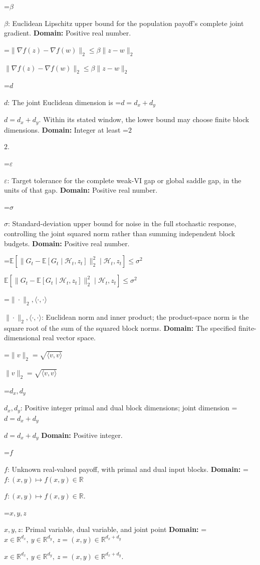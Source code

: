 \documentclass[10pt,a4paper]{article}
\newcommand{\AtlasMath}[1]{\par\begingroup\centering\setbox0=\hbox{$\displaystyle #1$}\ifdim\wd0>1.4\linewidth\typeout{ATLAS WIDE FORMULA: \the\wd0}\fi\ifdim\wd0>\linewidth\resizebox{\linewidth}{!}{\box0}\else\box0\fi\par\endgroup}
\newcommand{\AtlasInlineMath}[1]{\begingroup\setbox0=\hbox{$#1$}\ifdim\wd0>.4\linewidth\endgroup\AtlasMath{#1}\else\endgroup$#1$\fi}
\begin{document}
\AtlasInlineMath{\beta}: Euclidean Lipschitz upper bound for the population payoff's complete joint gradient. \textbf{Domain:} Positive real number.



\AtlasInlineMath{\|\nabla f(z)-\nabla f(w)\|_2\le\beta\|z-w\|_2}



\AtlasInlineMath{d}: The joint Euclidean dimension is \AtlasInlineMath{d=d_x+d_y}. Within its stated window, the lower bound may choose finite block dimensions. \textbf{Domain:} Integer at least \AtlasInlineMath{2}.



\AtlasInlineMath{\varepsilon}: Target tolerance for the complete weak-VI gap or global saddle gap, in the units of that gap. \textbf{Domain:} Positive real number.



\AtlasInlineMath{\sigma}: Standard-deviation upper bound for noise in the full stochastic response, controlling the joint squared norm rather than summing independent block budgets. \textbf{Domain:} Positive real number.



\AtlasInlineMath{\mathbb E[\|G_t-\mathbb E[G_t\mid\mathcal H_t,z_t]\|_2^2\mid\mathcal H_t,z_t]\le\sigma^2}



\AtlasInlineMath{\|\cdot\|_2,\langle\cdot,\cdot\rangle}: Euclidean norm and inner product; the product-space norm is the square root of the sum of the squared block norms. \textbf{Domain:} The specified finite-dimensional real vector space.



\AtlasInlineMath{\|v\|_2=\sqrt{\langle v,v\rangle}}



\AtlasInlineMath{d_x,d_y}: Positive integer primal and dual block dimensions; joint dimension \AtlasInlineMath{d=d_x+d_y} \textbf{Domain:} Positive integer.



\AtlasInlineMath{f}: Unknown real-valued payoff, with primal and dual input blocks. \textbf{Domain:} \AtlasInlineMath{f:(x,y)\mapsto f(x,y)\in\mathbb R}.



\AtlasInlineMath{x,y,z}: Primal variable, dual variable, and joint point \textbf{Domain:} \AtlasInlineMath{x\in\mathbb R^{d_x},\ y\in\mathbb R^{d_y},\ z=(x,y)\in\mathbb R^{d_x+d_y}}.
\end{document}
